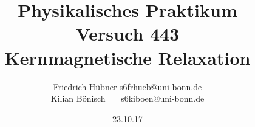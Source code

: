 \documentclass{article}
\newcommand{\RM}[1]{\MakeUppercase{\romannumeral #1}}
\begin{document}
\setlength{\parindent}{0em}   %
\title{Physikalisches Praktikum \RM{4}\\Versuch 443\\Kernmagnetische Relaxation}
\author{Friedrich Hübner \qquad s6frhueb@uni-bonn.de \\
  Kilian Bönisch \ \ \ \qquad s6kiboen@uni-bonn.de }
\date{23.10.17}

\maketitle

\thispagestyle{empty}

\newpage







\printbibliography
\end{document}
